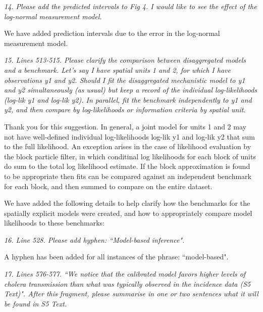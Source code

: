 \documentclass[11pt]{article}
\newcommand\report[1]{{\color{mygreen} \vspace{1mm}\hspace{0.25in}\parbox{6in}{\em #1}}}
\newcommand\article[1]{{\color{blue} \vspace{1mm}\hspace{0.25in}\parbox{6in}{\em #1}}}
\begin{document}
\report{
  14. Please add the predicted intervals to Fig 4. I would like to see the effect of the log-normal measurement model.
}

We have added prediction intervals due to the error in the log-normal measurement model.

\report{
  15. Lines 513-515. Please clarify the comparison between disaggregated models and a benchmark. Let’s say I have spatial units 1 and 2, for which I have observations y1 and y2. Should I fit the disaggregated mechanistic model to y1 and y2 simultaneously (as usual) but keep a record of the individual log-likelihoods (log-lik y1 and log-lik y2). In parallel, fit the benchmark independently to y1 and y2, and then compare by log-likelihoods or information criteria by spatial unit.
}

Thank you for this suggestion.
In general, a joint model for units 1 and 2 may not have well-defined individual log-likelihoods log-lik y1 and log-lik y2 that sum to the full likelihood.
An exception arises in the case of likelihood evaluation by the block particle filter, in which conditinal log likelihoods for each block of units do sum to the total log likelihood estimate.
If the block approximation is found to be appropriate \cite{ionides21,ionides22} then fits can be compared against an independent benchmark for each block, and then summed to compare on the entire dataset.

We have added the following details to help clarify how the benchmarks for the spatially explicit models were created, and how to appropriately compare model likelihoods to these benchmarks:

\article{\editSpatBench}


\report{
  16. Line 528. Please add hyphen: ``Model-based inference".
}

A hyphen has been added for all instances of the phrase: ``model-based".

\report{
  17. Lines 576-577. ``We notice that the calibrated model favors higher levels of cholera transmission than what was typically observed in the incidence data (S5 Text)". After this fragment, please summarise in one or two sentences what it will be found in S5 Text.
}

\end{document}
